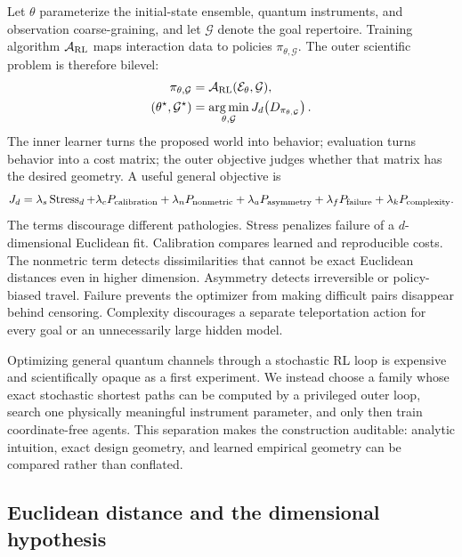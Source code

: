 \documentclass[11pt]{article}
\newcommand{\argmin}{\operatorname*{arg\,min}}
\begin{document}
Let $\theta$ parameterize the initial-state ensemble, quantum instruments, and
observation coarse-graining, and let $\mathcal G$ denote the goal repertoire.
Training algorithm $\mathcal A_{\rm RL}$ maps interaction data to policies
$\pi_{\theta,\mathcal G}$. The outer scientific problem is therefore bilevel:
\begin{align}
 \pi_{\theta,\mathcal G}
 &=\mathcal A_{\rm RL}(\mathcal E_\theta,\mathcal G),\\
 (\theta^\star,\mathcal G^\star)
 &=\argmin_{\theta,\mathcal G}
 J_d\!\left(D_{\pi_{\theta,\mathcal G}}\right).
 \label{eq:bilevel-map}
\end{align}
The inner learner turns the proposed world into behavior; evaluation turns
behavior into a cost matrix; the outer objective judges whether that matrix
has the desired geometry. A useful general objective is
\begin{equation}
 J_d=\lambda_s\operatorname{Stress}_d
 +\lambda_c P_{\rm calibration}+\lambda_n P_{\rm nonmetric}
 +\lambda_a P_{\rm asymmetry}+\lambda_f P_{\rm failure}
 +\lambda_k P_{\rm complexity}.
 \label{eq:bilevel}
\end{equation}
The terms discourage different pathologies. Stress penalizes failure of a
$d$-dimensional Euclidean fit. Calibration compares learned and reproducible
costs. The nonmetric term detects dissimilarities that cannot be exact
Euclidean distances even in higher dimension. Asymmetry detects irreversible
or policy-biased travel. Failure prevents the optimizer from making difficult
pairs disappear behind censoring. Complexity discourages a separate
teleportation action for every goal or an unnecessarily large hidden model.

Optimizing general quantum channels through a stochastic RL loop is expensive
and scientifically opaque as a first experiment. We instead choose a family
whose exact stochastic shortest paths can be computed by a privileged outer
loop, search one physically meaningful instrument parameter, and only then
train coordinate-free agents. This separation makes the construction
auditable: analytic intuition, exact design geometry, and learned empirical
geometry can be compared rather than conflated.

\subsection{Euclidean distance and the dimensional hypothesis}
\end{document}
